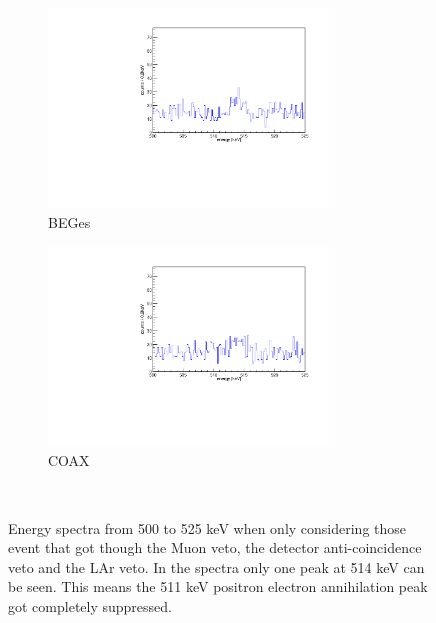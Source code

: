 \documentclass[encoding=utf8,british]{tumphthesis}
\begin{document}
\begin{figure}[t!]
\centering
\begin{subfigure}{0.5\textwidth}
	\includegraphics[width=75mm]{./Bilder/500525LArVetoBEGes.pdf}
    \caption{BEGes}
  \label{fig:LArBEGes}
\end{subfigure}\hfill%
\begin{subfigure}{0.5\textwidth}
	\includegraphics[width=75mm]{./Bilder/500525LArVetoCOAX.pdf}
  \caption{COAX}
  \label{fig:LArCOAX}
\end{subfigure}
    \\
	\vspace{0.5cm}
    \caption{Energy spectra from 500 to 525 keV when only considering those event that got though the Muon veto, the detector anti-coincidence veto and the LAr veto. In the spectra only one peak at 514 keV can be seen. This means the 511 keV positron electron annihilation peak got completely suppressed.}
\end{figure}
\end{document}
